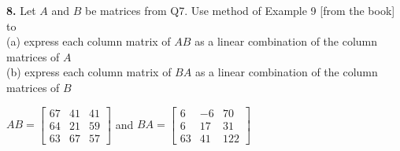 \documentclass[addpoints]{exam}
\begin{document}
\begin{sloppypar}
\begin{questions}
    \question
    \textbf{8. } Let $A$ and $B$ be matrices from Q7. Use method of Example 9 [from the book] to \\ 
    (a) express each column matrix of $AB$ as a linear combination of the column matrices of $A$ \\ 
    (b) express each column matrix of $BA$ as a linear combination of the column matrices of $B$
    \begin{solution}
        $ AB = \begin{bmatrix}
            67 & 41 & 41 \\ 
            64 & 21 & 59 \\ 
            63 & 67 & 57
        \end{bmatrix} $ and $ BA = \begin{bmatrix}
            6 & -6 & 70 \\ 
            6 & 17 & 31 \\ 
            63 & 41 & 122
        \end{bmatrix} $


\end{solution}
\end{questions}
\end{sloppypar}
\end{document}
